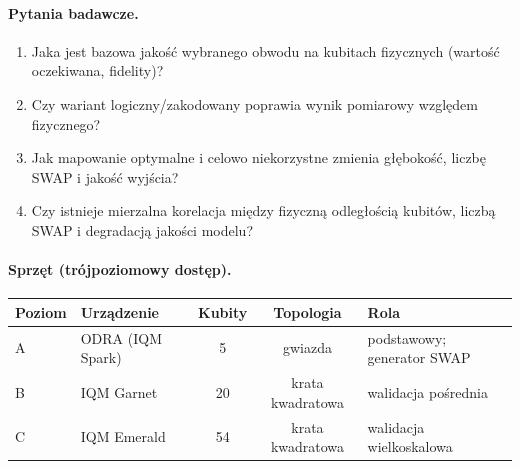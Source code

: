\documentclass[11pt,a4paper]{article}
\begin{document}
\paragraph{Pytania badawcze.}
\begin{enumerate}
\item Jaka jest bazowa jakość wybranego obwodu na kubitach fizycznych (wartość oczekiwana,
      fidelity)?
\item Czy wariant logiczny/zakodowany poprawia wynik pomiarowy względem fizycznego?
\item Jak mapowanie optymalne i celowo niekorzystne zmienia głębokość, liczbę SWAP
      i jakość wyjścia?
\item Czy istnieje mierzalna korelacja między fizyczną odległością kubitów, liczbą SWAP
      i degradacją jakości modelu?
\end{enumerate}

\paragraph{Sprzęt (trójpoziomowy dostęp).}

\begin{center}
\begin{tabular}{@{}llccl@{}}
\toprule
\textbf{Poziom} & \textbf{Urządzenie} & \textbf{Kubity} & \textbf{Topologia} & \textbf{Rola} \\
\midrule
A & ODRA (IQM Spark) & 5  & gwiazda        & podstawowy; generator SWAP \\
B & IQM Garnet       & 20 & krata kwadratowa & walidacja pośrednia \\
C & IQM Emerald      & 54 & krata kwadratowa & walidacja wielkoskalowa \\
\bottomrule
\end{tabular}
\end{center}
\end{document}
